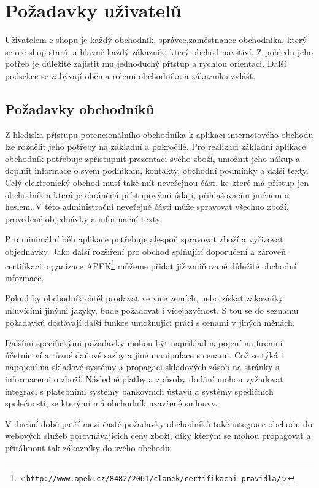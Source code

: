 \documentclass[11pt,twoside,a4paper]{book}
\let\oldUrl\url
\renewcommand\url[1]{<\texttt{\oldUrl{#1}}>}
\begin{document}
\section{Požadavky uživatelů}
\label{potreby3}
Uživatelem e-shopu je každý obchodník, správce,zaměstnanec obchodníka, který se o e-shop stará, a hlavně každý zákazník, který obchod navštíví. Z pohledu jeho potřeb je důležité zajistit mu jednoduchý přístup a rychlou orientaci. Další podsekce se zabývají oběma rolemi obchodníka a zákazníka zvlášť. 

\subsection{Požadavky obchodníků}
\label{potreby1}
Z hlediska přístupu potencionálního obchodníka k aplikaci internetového obchodu lze rozdělit jeho potřeby na základní a pokročilé. Pro realizaci základní aplikace obchodník potřebuje zpřístupnit prezentaci svého zboží, umožnit jeho nákup a doplnit informace o svém podnikání, kontakty, obchodní podmínky a další texty. Celý elektronický obchod musí také mít neveřejnou část, ke které má přístup jen obchodník a která je chráněná přístupovými údaji, přihlašovacím jménem a heslem. V této administrační neveřejné části může spravovat všechno zboží, provedené objednávky a informační texty.

Pro minimální běh aplikace potřebuje alespoň spravovat zboží a vyřizovat objednávky. Jako další rozšíření pro obchod splňující doporučení a zároveň certifikaci organizace APEK\footnote{\url{http://www.apek.cz/8482/2061/clanek/certifikacni-pravidla/}} můžeme přidat již zmiňované důležité obchodní informace.

Pokud by obchodník chtěl prodávat ve více zemích, nebo získat zákazníky mluvícími jinými jazyky, bude požadovat i vícejazyčnost. S tou se do seznamu požadavků dostávají další funkce umožnující práci s cenami v jiných měnách. 

Dalšími specifickými požadavky mohou být například napojení na firemní účetnictví a různé daňové sazby a jiné manipulace s cenami. Což se týká i napojení na skladové systémy a propagaci skladových zásob na stránky s informacemi o zboží. Následné platby a způsoby dodání mohou vyžadovat integraci s platebními systémy bankovních ústavů a systémy spedičních společností, se kterými má obchodník uzavřené smlouvy.

V dnešní době patří mezi časté požadavky obchodníků také integrace obchodu do webových služeb porovnávajících ceny zboží, díky kterým se mohou propagovat a přitáhnout tak zákazníky do svého obchodu.
\end{document}
